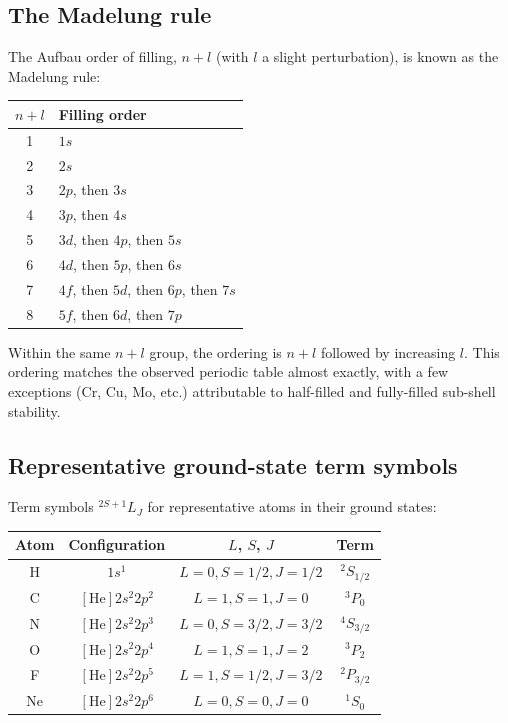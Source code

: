 \documentclass[11pt,twocolumn,a4paper]{article}
\theoremstyle{axiomstyle}
\theoremstyle{conseqstyle}
\theoremstyle{definition}
\theoremstyle{remark}
\begin{document}
\subsection{The Madelung rule}

The Aufbau order of filling, $n+l$ (with $l$ a slight perturbation), is known as the Madelung rule:
\begin{center}
\begin{tabular}{c|l}
\toprule
$n+l$ & Filling order \\
\midrule
1 & $1s$ \\
2 & $2s$ \\
3 & $2p$, then $3s$ \\
4 & $3p$, then $4s$ \\
5 & $3d$, then $4p$, then $5s$ \\
6 & $4d$, then $5p$, then $6s$ \\
7 & $4f$, then $5d$, then $6p$, then $7s$ \\
8 & $5f$, then $6d$, then $7p$\\
\bottomrule
\end{tabular}
\end{center}

Within the same $n+l$ group, the ordering is $n+l$ followed by increasing $l$. This ordering matches the observed periodic table almost exactly, with a few exceptions (Cr, Cu, Mo, etc.) attributable to half-filled and fully-filled sub-shell stability.

\subsection{Representative ground-state term symbols}

Term symbols ${}^{2S+1}L_{J}$ for representative atoms in their ground states:
\begin{center}
\begin{tabular}{c|c|c|c}
\toprule
Atom & Configuration & $L$, $S$, $J$ & Term\\
\midrule
H & $1s^{1}$ & $L=0,S=1/2,J=1/2$ & $^{2}S_{1/2}$\\
C & $[\text{He}]2s^{2}2p^{2}$ & $L=1,S=1,J=0$ & $^{3}P_{0}$\\
N & $[\text{He}]2s^{2}2p^{3}$ & $L=0,S=3/2,J=3/2$ & $^{4}S_{3/2}$\\
O & $[\text{He}]2s^{2}2p^{4}$ & $L=1,S=1,J=2$ & $^{3}P_{2}$\\
F & $[\text{He}]2s^{2}2p^{5}$ & $L=1,S=1/2,J=3/2$ & $^{2}P_{3/2}$\\
Ne & $[\text{He}]2s^{2}2p^{6}$ & $L=0,S=0,J=0$ & $^{1}S_{0}$\\
\bottomrule
\end{tabular}
\end{center}
\end{document}

